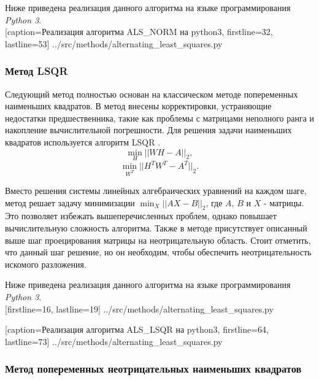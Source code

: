 \newpage

Ниже приведена реализация данного алгоритма на языке программирования \textit{Python 3}.
\\


  [caption=Реализация алгоритма ALS\_NORM на python3, firstline=32, lastline=53]
  {../src/methods/alternating_least_squares.py}

\newpage

\subsubsection{Метод LSQR}

Следующий метод полностью основан на классическом методе попеременных наименьших квадратов.
В метод внесены корректировки, устраняющие недостатки предшественника, такие как проблемы
с матрицами неполного ранга и накопление вычислительной погрешности.
Для решения задачи наименьших квадратов используется алгоритм LSQR \cite{lsqr}.
\begin{equation}
  \min_H||WH - A||_2,
\end{equation}
\begin{equation}
  \min_{W^T}||H^TW^T - A^T||_2.
\end{equation}

Вместо решения системы линейных алгебраических уравнений на каждом шаге,
метод решает задачу минимизации $\displaystyle\min_X||AX - B||_2$, где $A$, $B$ и $X$ - матрицы.
Это позволяет избежать вышеперечисленных проблем,
однако повышает вычислительную сложность алгоритма.
Также в методе присутствует описанный выше шаг проецирования матрицы
на неотрицательную область.
Стоит отметить, что данный шаг  решение, но он необходим,
чтобы обеспечить неотрицательность искомого разложения.

\newpage

Ниже приведена реализация данного алгоритма на языке программирования \textit{Python 3}.
\\



  [firstline=16, lastline=19]
  {../src/methods/alternating_least_squares.py}


  [caption=Реализация алгоритма ALS\_LSQR на python3, firstline=64, lastline=73]
  {../src/methods/alternating_least_squares.py}



\newpage


\subsubsection{Метод попеременных неотрицательных наименьших квадратов}

